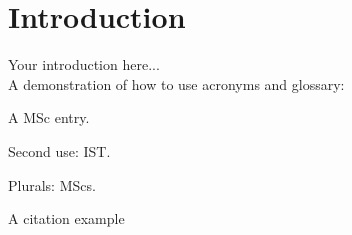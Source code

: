 
\chapter{Introduction}
\label{chapter:introduction}
Your introduction here...\\

A demonstration of how to use acronyms and glossary:

A \gls{MSc} entry.

Second use: \gls{IST}.

Plurals: \glspl{MSc}.

A citation example \cite{nobody}
